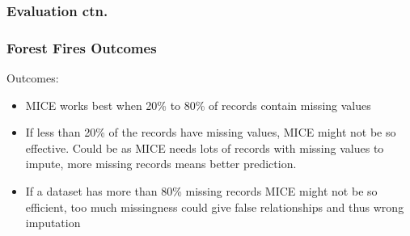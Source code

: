 \documentclass{beamer}
\begin{document}
\begin{frame}
  \frametitle{Evaluation ctn.}
\end{frame}

\begin{frame}
  \frametitle{Forest Fires Outcomes}
  Outcomes:
  \begin{itemize}
    \item MICE works best when 20\% to 80\% of records contain missing values 
    \item If less than 20\% of the records have missing values, MICE might not be so effective. Could be as MICE needs lots of records with missing values to impute, more missing records means better prediction. 
    \item If a dataset has more than 80\% missing records MICE might not be so efficient, too much missingness could give false relationships and thus wrong imputation
  \end{itemize}
\end{frame}
\end{document}
